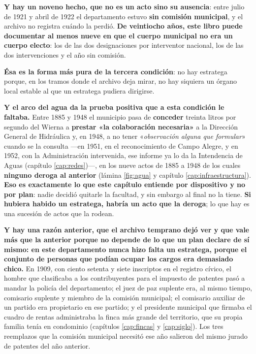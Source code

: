 \textbf{Y hay un noveno hecho, que no es un acto sino su ausencia}: entre julio de 1921 y abril
de 1922 el departamento estuvo \textbf{sin comisión municipal}, y el archivo no registra cuándo
la perdió. \textbf{De veintiocho años, este libro puede documentar al menos nueve en que el
cuerpo municipal no era un cuerpo electo}: los de las dos designaciones por interventor nacional,
los de las dos intervenciones y el año sin comisión.

\textbf{Ésa es la forma más pura de la tercera condición}: no hay estratega
porque, en los tramos donde el archivo deja mirar, no hay siquiera un órgano local estable al que
un estratega pudiera dirigirse.

\textbf{Y el arco del agua da la prueba positiva que a esta condición le faltaba.} Entre 1885 y
1948 el municipio pasa de \textbf{conceder} treinta litros por segundo del Wierna a
\textbf{prestar «la colaboración necesaria»} a la Dirección General de Hidráulica y, en 1948, a
no tener «\textit{observación alguna que formular}» cuando se la consulta ---en 1951, en el reconocimiento de Campo Alegre, y en 1952, con la Administración intervenida, ese informe ya lo da la Intendencia de Aguas (capítulo \ref{cap:redes})---, en los nueve actos de 1885 a 1948
de los cuales \textbf{ninguno deroga al anterior} (lámina \ref{fig:agua} y capítulo
\ref{cap:infraestructura}). \textbf{Eso es exactamente lo que este capítulo entiende por
dispositivo y no por plan}: nadie decidió quitarle la facultad, y sin embargo al final no la
tiene. \textbf{Si hubiera habido un estratega, habría un acto que la deroga}; lo que hay es una
sucesión de actos que la rodean.

\textbf{Y hay una razón anterior, que el archivo temprano dejó ver y que vale más que la
anterior porque no depende de lo que un plan declare de sí mismo: en este departamento nunca
hizo falta un estratega, porque el conjunto de personas que podían ocupar los cargos era
demasiado chico.} En 1909, con ciento setenta y siete inscriptos en el registro cívico, el
hombre que clasificaba a los contribuyentes para el impuesto de patentes pasó a mandar la
policía del departamento; el juez de paz suplente era, al mismo tiempo, comisario suplente y
miembro de la comisión municipal; el comisario auxiliar de un partido era propietario en ese
partido; y el presidente municipal que firmaba el cuadro de rentas administraba la finca más
grande del territorio, que su propia familia tenía en condominio (capítulos \ref{cap:fincas} y
\ref{cap:siglo}). Los tres reemplazos que la comisión municipal necesitó ese año salieron del
mismo jurado de patentes del año anterior.

